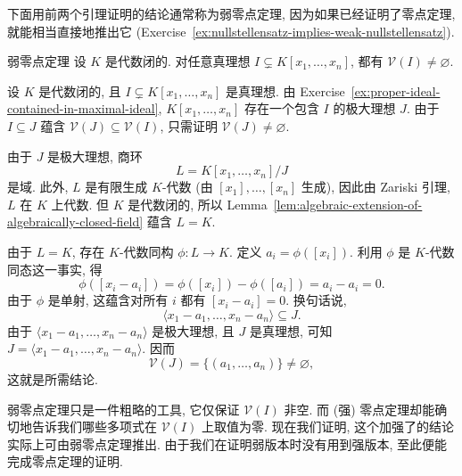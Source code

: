 下面用前两个引理证明的结论通常称为\textquotedbl{}弱零点定理\textquotedbl{}, 因为如果已经证明了零点定理, 就能相当直接地推出它 (Exercise~\ref{ex:nullstellensatz-implies-weak-nullstellensatz}).

\begin{Proposition}{弱零点定理}\leavevmode\label{prop:weak-nullstellensatz}
设 $K$ 是代数闭的. 对任意真理想 $I\subsetneq K[x_{1},\ldots,x_{n}]$, 都有 $\mathcal{V}(I)\neq\varnothing$.
\end{Proposition}
\begin{Proof}
设 $K$ 是代数闭的, 且 $I\subsetneq K[x_{1},\ldots,x_{n}]$ 是真理想. 由 Exercise~\ref{ex:proper-ideal-contained-in-maximal-ideal}, $K[x_{1},\ldots,x_{n}]$ 存在一个包含 $I$ 的极大理想 $J$. 由于 $I\subseteq J$ 蕴含 $\mathcal{V}(J)\subseteq\mathcal{V}(I)$, 只需证明 $\mathcal{V}(J)\neq\varnothing$.

由于 $J$ 是极大理想, 商环
\[
  L=K[x_{1},\ldots,x_{n}]/J
\]
是域. 此外, $L$ 是有限生成 $K$-代数 (由 $[x_{1}],\ldots,[x_{n}]$ 生成), 因此由 Zariski 引理, $L$ 在 $K$ 上代数. 但 $K$ 是代数闭的, 所以 Lemma~\ref{lem:algebraic-extension-of-algebraically-closed-field} 蕴含 $L=K$.

由于 $L=K$, 存在 $K$-代数同构 $\phi:L\to K$. 定义 $a_{i}=\phi([x_{i}])$. 利用 $\phi$ 是 $K$-代数同态这一事实, 得
\[
  \phi([x_{i}-a_{i}])=\phi([x_{i}])-\phi([a_{i}])=a_{i}-a_{i}=0.
\]
由于 $\phi$ 是单射, 这蕴含对所有 $i$ 都有 $[x_{i}-a_{i}]=0$. 换句话说,
\[
  \langle x_{1}-a_{1},\ldots,x_{n}-a_{n}\rangle\subseteq J.
\]
由于 $\langle x_{1}-a_{1},\ldots,x_{n}-a_{n}\rangle$ 是极大理想, 且 $J$ 是真理想, 可知 $J=\langle x_{1}-a_{1},\ldots,x_{n}-a_{n}\rangle$. 因而
\[
  \mathcal{V}(J)=\{(a_{1},\ldots,a_{n})\}\neq\varnothing,
\]
这就是所需结论.
\end{Proof}

弱零点定理只是一件粗略的工具, 它仅保证 $\mathcal{V}(I)$ 非空. 而 (强) 零点定理却能确切地告诉我们哪些多项式在 $\mathcal{V}(I)$ 上取值为零. 现在我们证明, 这个加强了的结论实际上可由弱零点定理推出. 由于我们在证明弱版本时没有用到强版本, 至此便能完成零点定理的证明.

